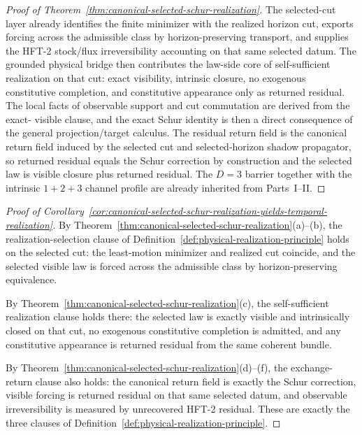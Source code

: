 \begin{proof}[Proof of Theorem~\ref{thm:canonical-selected-schur-realization}]
\label{proof:thm:canonical-selected-schur-realization}
The selected-cut layer already identifies the finite minimizer with the
realized horizon cut, exports forcing across the admissible class by
horizon-preserving transport, and supplies the HFT-2 stock/flux
irreversibility accounting on that same selected datum. The grounded physical
bridge then contributes the law-side core of self-sufficient realization on
that cut: exact visibility, intrinsic closure, no exogenous constitutive
completion, and constitutive appearance only as returned residual. The local
facts of observable support and cut commutation are derived from the exact-
visible clause, and the exact Schur identity is then a direct consequence of
the general projection/target calculus. The residual return field is the
canonical return field induced by
the selected cut and selected-horizon shadow propagator, so returned residual
equals the Schur correction by construction and the selected law is visible
closure plus returned residual. The \(D=3\) barrier together with the intrinsic
\(1+2+3\) channel profile are already inherited from Parts~I--II.
\end{proof}

\begin{proof}[Proof of Corollary~\ref{cor:canonical-selected-schur-realization-yields-temporal-realization}]
\label{proof:cor:canonical-selected-schur-realization-yields-temporal-realization}
By Theorem~\ref{thm:canonical-selected-schur-realization}(a)--(b), the
realization-selection clause of
Definition~\ref{def:physical-realization-principle} holds on the selected cut:
the least-motion minimizer and realized cut coincide, and the selected visible
law is forced across the admissible class by horizon-preserving equivalence.

By Theorem~\ref{thm:canonical-selected-schur-realization}(c), the
self-sufficient realization clause holds there: the selected law is exactly
visible and intrinsically closed on that cut, no exogenous constitutive
completion is admitted, and any constitutive appearance is returned residual
from the same coherent bundle.

By Theorem~\ref{thm:canonical-selected-schur-realization}(d)--(f), the
exchange-return clause also holds: the canonical return field is exactly the
Schur correction, visible forcing is returned residual on that same selected
datum, and observable irreversibility is measured by unrecovered HFT-2
residual. These are exactly the three clauses of
Definition~\ref{def:physical-realization-principle}.
\end{proof}

